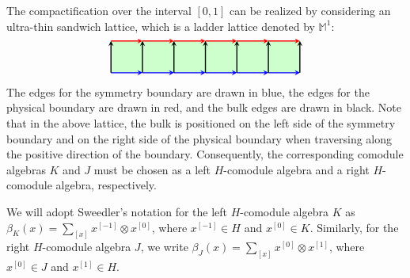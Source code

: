 \documentclass[a4paper,11pt]{article}
\theoremstyle{theorem}
\theoremstyle{remark}
\begin{document}
The compactification over the interval \([0,1]\) can be realized by considering an ultra-thin sandwich lattice, which is a ladder lattice denoted by \(\mathbb{M}^1\):
\begin{equation}\label{eq:ClusterLadder}
\begin{aligned}
\begin{tikzpicture}
    \def\n{5}
    \def\s{1}
    
    \fill[green!20] (0, 0) rectangle (\n*\s+\s, \s); %

    \foreach \i in {0,...,\n} {
        \draw[-stealth, line width=1.0pt,blue, midway] (\i*\s, 0) -- (\i*\s+\s, 0);
        \draw[-stealth, line width=1.0pt,red, midway] (\i*\s, \s) -- (\i*\s+\s, \s);
        \draw[-stealth,line width=1.0pt, midway] (\i*\s, 0) -- (\i*\s, \s);
    }
    \draw[-stealth, midway,line width=1.0pt] (\n*\s+\s, 0) -- (\n*\s+\s, \s);
\end{tikzpicture}
\end{aligned}
\end{equation}
The edges for the symmetry boundary are drawn in blue, the edges for the physical boundary are drawn in red, and the bulk edges are drawn in black. Note that in the above lattice, the bulk is positioned on the left side of the symmetry boundary and on the right side of the physical boundary when traversing along the positive direction of the boundary. Consequently, the corresponding comodule algebras \(K\) and \(J\) must be chosen as a left \(H\)-comodule algebra and a right \(H\)-comodule algebra, respectively. 

We will adopt Sweedler's notation for the left $H$-comodule algebra \(K\) as \(\beta_K(x) = \sum_{[x]} x^{[-1]} \otimes x^{[0]}\), where \(x^{[-1]} \in H\) and \(x^{[0]} \in K\). Similarly, for the right $H$-comodule algebra \(J\), we write \(\beta_J(x) = \sum_{[x]} x^{[0]} \otimes x^{[1]}\), where \(x^{[0]} \in J\) and \(x^{[1]} \in H\).
\end{document}

